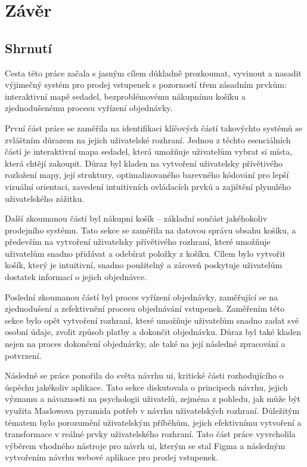 \chapter*{Závěr}
\label{ch:zaver}

\section*{Shrnutí}
\label{sec:zaver-shrnuti}
Cesta této práce začala s jasným cílem důkladně prozkoumat, vyvinout a nasadit výjimečný systém pro prodej vstupenek s pozorností třem zásadním prvkům: interaktivní mapě sedadel, bezproblémovému nákupnímu košíku a zjednodušenému procesu vyřízení objednávky.

První část práce se zaměřila na identifikaci klíčových částí takovýchto systémů se zvláštním důrazem na jejich uživatelské rozhraní.
Jednou z těchto esenciálních částí je interaktivní mapa sedadel, která umožňuje uživatelům vybrat si místa, která chtějí zakoupit.
Důraz byl kladen na vytvoření uživatelsky přívětivého rozložení mapy, její struktury, optimalizovaného barevného kódování pro lepší vizuální orientaci, zavedení intuitivních ovládacích prvků a zajištění plynulého uživatelského zážitku.

Další zkoumanou částí byl nákupní košík – základní součást jakéhokoliv prodejního systému.
Tato sekce se zaměřila na datovou správu obsahu košíku, a především na vytvoření uživatelsky přívětivého rozhraní, které umožňuje uživatelům snadno přidávat a odebírat položky z košíku.
Cílem bylo vytvořit košík, který je intuitivní, snadno použitelný a zároveň poskytuje uživatelům dostatek informací o jejich objednávce.

Poslední zkoumanou částí byl proces vyřízení objednávky, zaměřující se na zjednodušení a zefektivnění procesu objednávání vstupenek.
Zaměřením této sekce bylo opět vytvoření rozhraní, které umožňuje uživatelům snadno zadat své osobní údaje, zvolit způsob platby a dokončit objednávku.
Důraz byl také kladen nejen na proces dokončení objednávky, ale také na její následné zpracování a potvrzení.

Následně se práce ponořila do světa návrhu \ac{ui}, kritické části rozhodujícího o úspěchu jakékoliv aplikace.
Tato sekce diskutovala o principech návrhu, jejich významu a návaznosti na psychologii uživatelů, zejména z pohledu, jak může být využita Maslowova pyramida potřeb v návrhu uživatelských rozhraní.
Důležitým tématem bylo porozumění uživatelským příběhům, jejich efektivnímu vytvoření a transformace v reálné prvky uživatelského rozhraní.
Tato část práce vyvrcholila výběrem vhodného nástroje pro návrh \ac{ui}, kterým se stal Figma a následným vytvořením návrhu webové aplikace pro prodej vstupenek.


